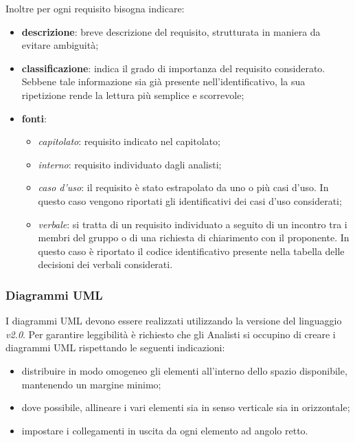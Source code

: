                 \noindent Inoltre per ogni requisito bisogna indicare: 
                \begin{itemize}
                	\item{\textbf{descrizione}}: breve descrizione del requisito, strutturata in maniera da evitare ambiguità; 
                	
                	\item{\textbf{classificazione}}: indica il grado di importanza del requisito considerato. Sebbene tale informazione sia già presente nell'identificativo, la sua ripetizione rende la lettura più semplice e scorrevole;	
                	
                	\item{\textbf{fonti}}:   
                	\begin{itemize}
                		\item \textit{capitolato}: requisito indicato nel capitolato; 
                		\item \textit{interno}: requisito individuato dagli analisti; 
                		\item \textit{caso d'uso}: il requisito è stato estrapolato da uno o più casi d'uso. In questo caso vengono riportati gli identificativi dei casi d'uso considerati; 
                		\item \textit{verbale}: si tratta di un requisito individuato a seguito di un incontro tra i membri del gruppo o di una richiesta di chiarimento con il proponente. 
                		In questo caso è riportato il codice identificativo presente nella tabella delle decisioni dei verbali considerati. 
                	\end{itemize} 
                \end{itemize} 
                         
            \subsubsection*{Diagrammi UML}
            I diagrammi UML devono essere realizzati utilizzando la versione del linguaggio \textit{v2.0}.
            Per garantire leggibilità è richiesto che gli Analisti si occupino di creare i diagrammi UML 
            rispettando le seguenti indicazioni: 
            \begin{itemize}
            	\item distribuire in modo omogeneo gli elementi all'interno dello spazio disponibile, mantenendo un margine minimo; 
            	\item dove possibile, allineare i vari elementi sia in senso verticale sia in orizzontale; 
            	\item impostare i collegamenti in uscita da ogni elemento ad angolo retto.  
            \end{itemize}
            
